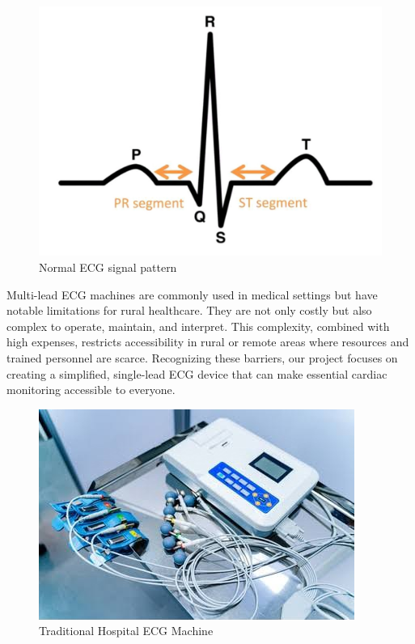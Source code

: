 \begin{figure}[H]
    \centering
    \includegraphics[scale=0.1]{images/pqrst.jpg}
    \caption{Normal ECG signal pattern}
    \label{fig:pqrst}
\end{figure}
Multi-lead ECG machines are commonly used in medical settings but have notable limitations for rural healthcare. They are not only costly but also complex to operate, maintain, and interpret. This complexity, combined with high expenses, restricts accessibility in rural or remote areas where resources and trained personnel are scarce. Recognizing these barriers, our project focuses on creating a simplified, single-lead ECG device that can make essential cardiac monitoring accessible to everyone.
\begin{figure}[H]
    \centering
    \includegraphics[scale=1]{images/hospital_ecg.jpg}
    \caption{Traditional Hospital ECG Machine}
    \label{fig:hospital_ecg}
\end{figure}



